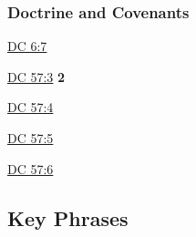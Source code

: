 	
		
		
	\subsubsection{Doctrine and Covenants} %
		\label{WISDOM-DC}
	
		
		\begin{compactdesc}
			\item[{\hyperref[DC6-7]{DC 6:7}}] 
			\item[{\hyperref[DC57-3]{DC 57:3}}] \textbf{2} 
			\item[{\hyperref[DC57-4]{DC 57:4}}]
			\item[{\hyperref[DC57-5]{DC 57:5}}]
			\item[{\hyperref[DC57-6]{DC 57:6}}]
		\end{compactdesc}
		
	
		
		
\subsection{Key Phrases} %
	\label{WISDOM-PHRASES}

